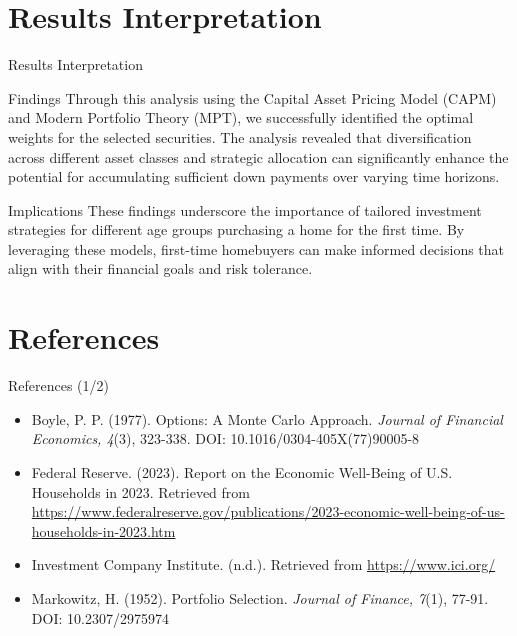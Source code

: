 \documentclass{beamer}
\begin{document}
\section{Results Interpretation}
\begin{frame}{Results Interpretation}
    \begin{block}{Findings}
        Through this analysis using the Capital Asset Pricing Model (CAPM) and Modern Portfolio Theory (MPT), we successfully identified the optimal weights for the selected securities. The analysis revealed that diversification across different asset classes and strategic allocation can significantly enhance the potential for accumulating sufficient down payments over varying time horizons.
    \end{block}
    \begin{block}{Implications}
        These findings underscore the importance of tailored investment strategies for different age groups purchasing a home for the first time. By leveraging these models, first-time homebuyers can make informed decisions that align with their financial goals and risk tolerance.
    \end{block}
\end{frame}






\section{References}
\begin{frame}{References (1/2)}
    \begin{block}{}
        \begin{itemize}
            \item Boyle, P. P. (1977). Options: A Monte Carlo Approach. \textit{Journal of Financial Economics, 4}(3), 323-338. DOI: 10.1016/0304-405X(77)90005-8
            \item Federal Reserve. (2023). Report on the Economic Well-Being of U.S. Households in 2023. Retrieved from \url{https://www.federalreserve.gov/publications/2023-economic-well-being-of-us-households-in-2023.htm}
            \item Investment Company Institute. (n.d.). Retrieved from \url{https://www.ici.org/}
            \item Markowitz, H. (1952). Portfolio Selection. \textit{Journal of Finance, 7}(1), 77-91. DOI: 10.2307/2975974
        \end{itemize}
    \end{block}
\end{frame}
\end{document}
